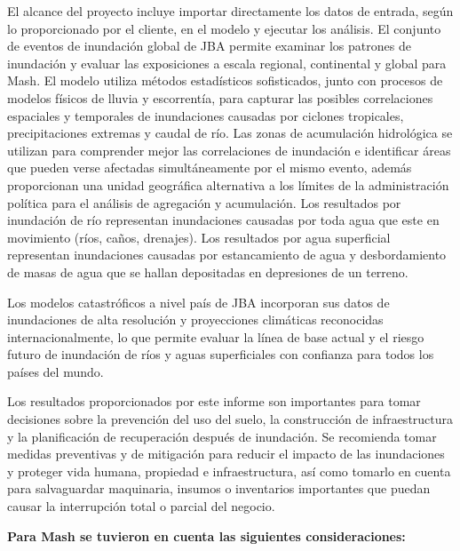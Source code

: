 \documentclass[
]{article}
\begin{document}
\fontsize{11}{13}\selectfont El alcance del proyecto incluye importar
directamente los datos de entrada, según lo proporcionado por el
cliente, en el modelo y ejecutar los análisis. El conjunto de eventos de
inundación global de JBA permite examinar los patrones de inundación y
evaluar las exposiciones a escala regional, continental y global para
Mash. El modelo utiliza métodos estadísticos sofisticados, junto con
procesos de modelos físicos de lluvia y escorrentía, para capturar las
posibles correlaciones espaciales y temporales de inundaciones causadas
por ciclones tropicales, precipitaciones extremas y caudal de río. Las
zonas de acumulación hidrológica se utilizan para comprender mejor las
correlaciones de inundación e identificar áreas que pueden verse
afectadas simultáneamente por el mismo evento, además proporcionan una
unidad geográfica alternativa a los límites de la administración
política para el análisis de agregación y acumulación. Los resultados
por inundación de río representan inundaciones causadas por toda agua
que este en movimiento (ríos, caños, drenajes). Los resultados por agua
superficial representan inundaciones causadas por estancamiento de agua
y desbordamiento de masas de agua que se hallan depositadas en
depresiones de un terreno.

\fontsize{11}{13}\selectfont Los modelos catastróficos a nivel país de
JBA incorporan sus datos de inundaciones de alta resolución y
proyecciones climáticas reconocidas internacionalmente, lo que permite
evaluar la línea de base actual y el riesgo futuro de inundación de ríos
y aguas superficiales con confianza para todos los países del mundo.

\fontsize{11}{13}\selectfont Los resultados proporcionados por este
informe son importantes para tomar decisiones sobre la prevención del
uso del suelo, la construcción de infraestructura y la planificación de
recuperación después de inundación. Se recomienda tomar medidas
preventivas y de mitigación para reducir el impacto de las inundaciones
y proteger vida humana, propiedad e infraestructura, así como tomarlo en
cuenta para salvaguardar maquinaria, insumos o inventarios importantes
que puedan causar la interrupción total o parcial del negocio.

\newpage

\noindent \textbf{\textcolor{azuloscuro}{\fontsize{11}{13}\selectfont Para Mash se tuvieron en cuenta las siguientes consideraciones:}}
\vspace{0.5cm}
\end{document}
